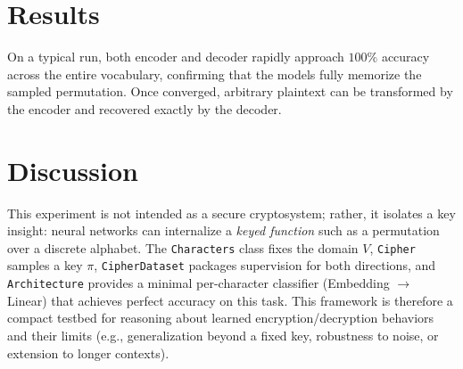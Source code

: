 \documentclass[12pt]{article}
\begin{document}
\section{Results}
On a typical run, both encoder and decoder rapidly approach $100\%$ accuracy across the entire vocabulary, confirming that the models fully memorize the sampled permutation. Once converged, arbitrary plaintext can be transformed by the encoder and recovered exactly by the decoder.

\section{Discussion}
This experiment is not intended as a secure cryptosystem; rather, it isolates a key insight: neural networks can internalize a \emph{keyed function} such as a permutation over a discrete alphabet. 
The \texttt{Characters} class fixes the domain $V$, \texttt{Cipher} samples a key $\pi$, \texttt{CipherDataset} packages supervision for both directions, and \texttt{Architecture} provides a minimal per-character classifier (Embedding $\rightarrow$ Linear) that achieves perfect accuracy on this task. 
This framework is therefore a compact testbed for reasoning about learned encryption/decryption behaviors and their limits (e.g., generalization beyond a fixed key, robustness to noise, or extension to longer contexts).
\end{document}
